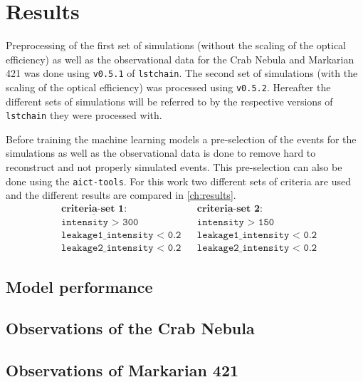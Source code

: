 \chapter{Results}
\label{ch:results}
Preprocessing of the first set of simulations (without the scaling of the optical efficiency) as well as the observational data for the Crab Nebula and 
Markarian 421 was done using \texttt{v0.5.1} of \texttt{lstchain}.
The second set of simulations (with the scaling of the optical efficiency) was processed using \texttt{v0.5.2}.
Hereafter the different sets of simulations will be referred to by the respective versions of \texttt{lstchain} they were processed with.

Before training the machine learning models a pre-selection of the events for the simulations as well as the observational data is done to remove 
hard to reconstruct and not properly simulated events. 
This pre-selection can also be done using the \texttt{aict-tools}.
For this work two different sets of criteria are used and the different results are compared in \autoref{ch:results}.
\begin{align*}
    &\underline{\textbf{criteria-set 1:}} & &\underline{\textbf{criteria-set 2:}} \\
    &\texttt{intensity > 300} & &\texttt{intensity > 150} \\
    &\texttt{leakage1\_intensity < 0.2} & &\texttt{leakage1\_intensity < 0.2} \\
    &\texttt{leakage2\_intensity < 0.2} & &\texttt{leakage2\_intensity < 0.2}
\end{align*}

\section{Model performance}


\section{Observations of the Crab Nebula}


\section{Observations of Markarian 421}
